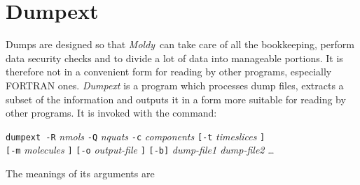 \documentclass[twoside]{report}
\newcommand{\moldy}{{\em Moldy}}
\begin{document}
\section{Dumpext}%
Dumps are designed so that \moldy\ can take care of all the
bookkeeping, perform data security checks and to divide a lot of data
into manageable portions.  It is therefore not in a convenient form
for reading by other programs, especially FORTRAN ones.  {\em
Dumpext\/} is a program which processes dump files, extracts a
subset of the information and outputs it in a form more suitable for
reading by other programs.  It is invoked with the command:
\begin{center}
\texttt{dumpext -R} {\em nmols\/} \texttt{-Q} {\em nquats\/} 
\texttt{-c} {\em components\/}
\texttt{[-t} {\em timeslices\/} \texttt{]} \\
\texttt{[-m} {\em molecules\/} \texttt{]}
\texttt{[-o} {\em output-file} \texttt{]}
\texttt{[-b]} 
{\em dump-file1 dump-file2} \ldots
\end{center}
The meanings of its arguments are
\newcommand{\boldlabel}[1]{{\bf #1 \hfil}}
\end{document}
